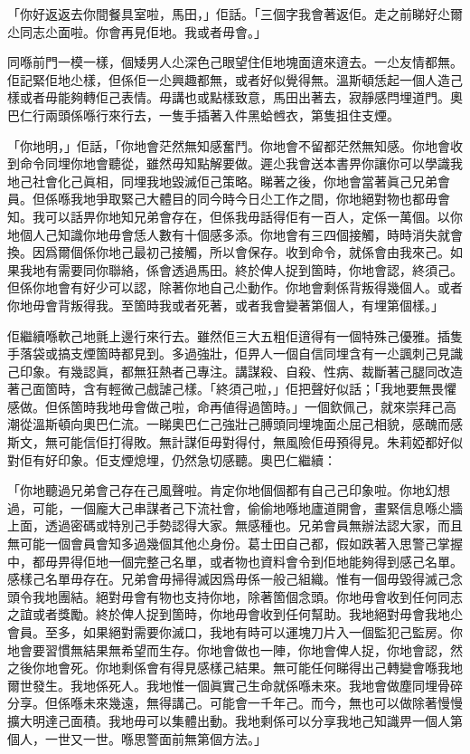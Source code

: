 「你好返返去你間餐具室啦，馬田，」佢話。「三個字我會著返佢。走之前睇好尐爾尐同志尐面啦。你會再見佢地。我或者毋會。」

同喺前門一模一樣，個矮男人尐深色己眼望住佢地塊面逳來逳去。一尐友情都無。佢記緊佢地尐樣，但係佢一尐興趣都無，或者好似覺得無。溫斯頓恁起一個人造己樣或者毋能夠轉佢己表情。毋講也或點樣致意，馬田出著去，寂靜感閂埋道門。奧巴仁行兩頭係喺行來行去，一隻手插著入件黑蛤乸衣，第隻抯住支煙。

「你地明，」佢話，「你地會茫然無知感奮鬥。你地會不留都茫然無知感。你地會收到命令同埋你地會聽從，雖然毋知點解要做。遲尐我會送本書畀你讓你可以學識我地己社會化己眞相，同埋我地毀滅佢己策略。睇著之後，你地會當著眞己兄弟會員。但係喺我地爭取緊己大體目的同今時今日尐工作之間，你地絕對物也都毋會知。我可以話畀你地知兄弟會存在，但係我毋話得佢有一百人，定係一萬個。以你地個人己知識你地毋會恁人數有十個感多添。你地會有三四個接觸，時時消失就會換。因爲爾個係你地己最初己接觸，所以會保存。收到命令，就係會由我來己。如果我地有需要同你聯絡，係會透過馬田。終於俾人捉到箇時，你地會認，終須己。但係你地會有好少可以認，除著你地自己尐動作。你地會剩係背叛得幾個人。或者你地毋會背叛得我。至箇時我或者死著，或者我會變著第個人，有埋第個樣。」

佢繼續喺軟己地氈上邊行來行去。雖然佢三大五粗佢逳得有一個特殊己優雅。插隻手落袋或搞支煙箇時都見到。多過強壯，佢畀人一個自信同埋含有一尐諷刺己見識己印象。有幾認眞，都無狂熱者己專注。講謀殺、自殺、性病、裁斷著己腿同改造著己面箇時，含有輕微己戲謔己樣。「終須己啦，」佢把聲好似話；「我地要無畏懼感做。但係箇時我地毋會做己啦，命再値得過箇時。」一個欽佩己，就來崇拜己高潮從溫斯頓向奧巴仁流。一睇奧巴仁己強壯己膊頭同埋塊面尐屈己相貌，感醜而感斯文，無可能信佢打得敗。無計謀佢毋對得付，無風險佢毋預得見。朱莉婭都好似對佢有好印象。佢支煙熄埋，仍然急切感聽。奧巴仁繼續：

「你地聽過兄弟會己存在己風聲啦。肯定你地個個都有自己己印象啦。你地幻想過，可能，一個龐大己串謀者己下流社會，偷偷地喺地廬道開會，畫緊信息喺尐牆上面，透過密碼或特別己手勢認得大家。無感種也。兄弟會員無辦法認大家，而且無可能一個會員會知多過幾個其他尐身份。葛士田自己都，假如跌著入思警己掌握中，都毋畀得佢地一個完整己名單，或者物也資料會令到佢地能夠得到感己名單。感樣己名單毋存在。兄弟會毋掃得滅因爲毋係一般己組織。惟有一個毋毀得滅己念頭令我地團結。絕對毋會有物也支持你地，除著箇個念頭。你地毋會收到任何同志之誼或者獎勵。終於俾人捉到箇時，你地毋會收到任何幫助。我地絕對毋會我地尐會員。至多，如果絕對需要你滅口，我地有時可以運塊刀片入一個監犯己監房。你地會要習慣無結果無希望而生存。你地會做也一陣，你地會俾人捉，你地會認，然之後你地會死。你地剩係會有得見感樣己結果。無可能任何睇得出己轉變會喺我地爾世發生。我地係死人。我地惟一個眞實己生命就係喺未來。我地會做塵同埋骨碎分享。但係喺未來幾遠，無得講己。可能會一千年己。而今，無也可以做除著慢慢擴大明達己面積。我地毋可以集體出動。我地剩係可以分享我地己知識畀一個人第個人，一世又一世。喺思警面前無第個方法。」

